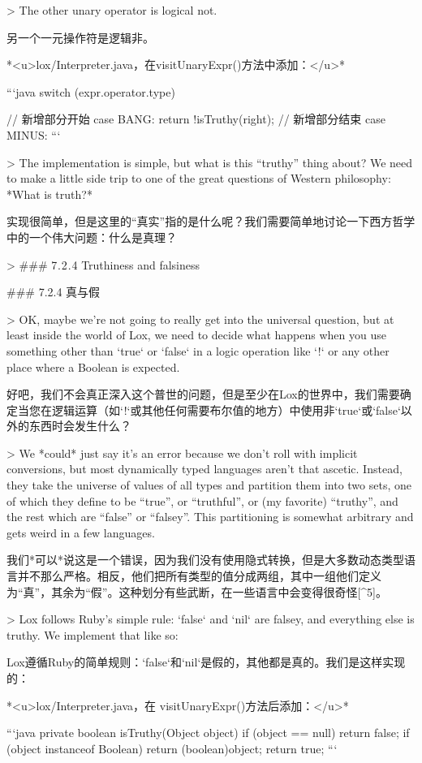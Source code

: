 \documentclass[cn,11pt,chinese]{elegantbook}
\begin{document}
{> The other unary operator is logical not.

另一个一元操作符是逻辑非。

*<u>lox/Interpreter.java，在visitUnaryExpr()方法中添加：</u>*

```java
		switch (expr.operator.type) { 
      // 新增部分开始  
			case BANG:
        return !isTruthy(right);
      // 新增部分结束
      case MINUS:
```

> The implementation is simple, but what is this “truthy” thing about? We need to make a little side trip to one of the great questions of Western philosophy: *What is truth?*

实现很简单，但是这里的“真实”指的是什么呢？我们需要简单地讨论一下西方哲学中的一个伟大问题：什么是真理？

> ### 7 . 2 . 4 Truthiness and falsiness

### 7.2.4 真与假

> OK, maybe we’re not going to really get into the universal question, but at least inside the world of Lox, we need to decide what happens when you use something other than `true` or `false` in a logic operation like `!` or any other place where a Boolean is expected.

好吧，我们不会真正深入这个普世的问题，但是至少在Lox的世界中，我们需要确定当您在逻辑运算（如`!`或其他任何需要布尔值的地方）中使用非`true`或`false`以外的东西时会发生什么？ 

> We *could* just say it’s an error because we don’t roll with implicit conversions, but most dynamically typed languages aren’t that ascetic. Instead, they take the universe of values of all types and partition them into two sets, one of which they define to be “true”, or “truthful”, or (my favorite) “truthy”, and the rest which are “false” or “falsey”. This partitioning is somewhat arbitrary and gets weird in a few languages.

我们*可以*说这是一个错误，因为我们没有使用隐式转换，但是大多数动态类型语言并不那么严格。相反，他们把所有类型的值分成两组，其中一组他们定义为“真”，其余为“假”。这种划分有些武断，在一些语言中会变得很奇怪[^5]。

> Lox follows Ruby’s simple rule: `false` and `nil` are falsey, and everything else is truthy. We implement that like so:

Lox遵循Ruby的简单规则：`false`和`nil`是假的，其他都是真的。我们是这样实现的：

*<u>lox/Interpreter.java，在 visitUnaryExpr()方法后添加：</u>*

```java
  private boolean isTruthy(Object object) {
    if (object == null) return false;
    if (object instanceof Boolean) return (boolean)object;
    return true;
  }
```

}}
\end{document}
